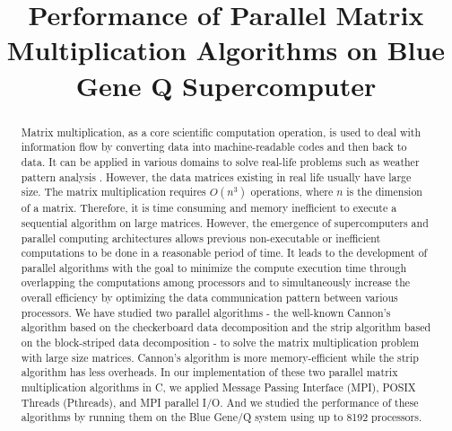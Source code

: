 \documentclass[conference]{IEEEtran}
\begin{document}
\title{Performance of Parallel Matrix Multiplication Algorithms on Blue Gene Q Supercomputer}

\author{
\and
}

\maketitle
\thispagestyle{plain}
\pagestyle{plain}

\begin{abstract}
Matrix multiplication, as a core scientific computation operation, is used to deal with information flow by converting data into machine-readable codes and then back to data. It can be applied in various domains to solve real-life problems such as weather pattern analysis \cite{b1}. However, the data matrices existing in real life usually have large size. The matrix multiplication requires $O(n^3)$ operations, where $n$ is the dimension of a matrix. Therefore, it is time consuming and memory inefficient to execute a sequential algorithm on large matrices. However, the emergence of supercomputers and parallel computing architectures allows previous non-executable or inefficient computations to be done in a reasonable period of time. It leads to the development of parallel algorithms with the goal to minimize the compute execution time through overlapping the computations among processors and to simultaneously increase the overall efficiency by optimizing the data communication pattern between various processors. We have studied two parallel algorithms - the well-known Cannon's algorithm based on the checkerboard data decomposition and the strip algorithm based on the block-striped data decomposition - to solve the matrix multiplication problem with large size matrices. Cannon's algorithm is more memory-efficient while the strip algorithm has less overheads. In our implementation of these two parallel matrix multiplication algorithms in C, we applied Message Passing Interface (MPI), POSIX Threads (Pthreads), and MPI parallel I/O. And we studied the performance of these algorithms by running them on the Blue Gene/Q system using up to 8192 processors. 
\end{abstract}
\end{document}
